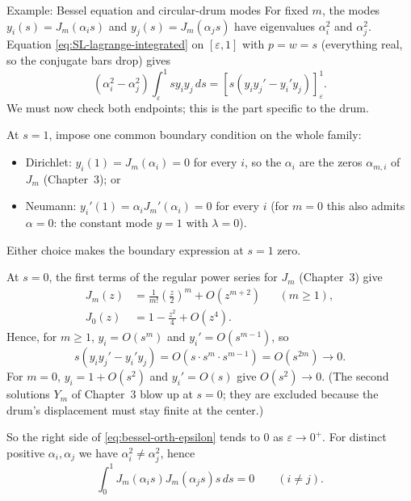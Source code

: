 \documentclass[11pt]{beamer}
\begin{document}
\begin{frame}[allowframebreaks=1.00]{Example: Bessel equation and circular-drum modes}
For fixed $m$, the modes $y_i(s)=J_m(\alpha_i s)$ and $y_j(s)=J_m(\alpha_j s)$ have
eigenvalues $\alpha_i^2$ and $\alpha_j^2$. Equation
\eqref{eq:SL-lagrange-integrated} on $[\varepsilon,1]$ with $p=w=s$ (everything real,
so the conjugate bars drop) gives
\begin{equation}
 (\alpha_i^2-\alpha_j^2)\int_\varepsilon^1 sy_i y_j\,ds
 =[s(y_iy_j'-y_i'y_j)]_\varepsilon^1.
 \label{eq:bessel-orth-epsilon}
\end{equation}
We must now check both endpoints; this is the part specific to the drum.

At $s=1$, impose one common boundary condition on the whole family:
\begin{itemize}
  \item Dirichlet: $y_i(1)=J_m(\alpha_i)=0$ for every $i$, so the $\alpha_i$ are the zeros
        $\alpha_{m,i}$ of $J_m$ (Chapter~3); or
  \item Neumann: $y_i'(1)=\alpha_iJ_m'(\alpha_i)=0$ for every $i$ (for $m=0$ this
        also admits $\alpha=0$: the constant mode $y=1$ with $\lambda=0$).
\end{itemize}
Either choice makes the boundary expression at $s=1$ zero.

At $s=0$, the first terms of the regular power series for $J_m$ (Chapter~3) give
\begin{align*}
  J_m(z)&=\frac1{m!}\left(\frac z2\right)^m+O(z^{m+2})
          &&(m\geq1),\\
  J_0(z)&=1-\frac{z^2}{4}+O(z^4).
\end{align*}
Hence, for $m\geq1$, $y_i=O(s^m)$ and $y_i'=O(s^{m-1})$, so
\[
  s(y_iy_j'-y_i'y_j)=O(s\cdot s^m\cdot s^{m-1})=O(s^{2m})\longrightarrow0.
\]
For $m=0$, $y_i=1+O(s^2)$ and $y_i'=O(s)$ give $O(s^2)\to0$.  (The second solutions
$Y_m$ of Chapter~3 blow up at $s=0$; they are excluded because the drum's displacement
must stay finite at the center.)

So the right side of \eqref{eq:bessel-orth-epsilon} tends to $0$ as $\varepsilon\to0^+$.
For distinct positive $\alpha_i,\alpha_j$ we have $\alpha_i^2\neq\alpha_j^2$, hence
\begin{equation}
  \int_0^1J_m(\alpha_i s)J_m(\alpha_j s)s\,ds=0
  \qquad(i\neq j).
  \label{eq:bessel-orth}
\end{equation}
\end{frame}
\end{document}
